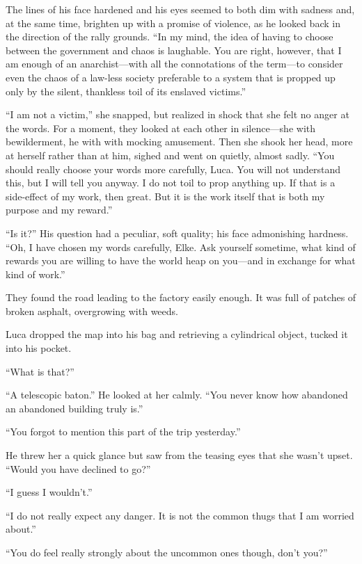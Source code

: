 The lines of his face hardened and his eyes seemed to both dim with sadness and, at the same time, brighten up with a promise of violence, as he looked back in the direction of the rally grounds. ``In my mind, the idea of having to choose between the government and chaos is laughable. You are right, however, that I am enough of an anarchist---with all the connotations of the term---to consider even the chaos of a law-less society preferable to a system that is propped up only by the silent, thankless toil of its enslaved victims.''

``I am not a victim,'' she snapped, but realized in shock that she felt no anger at the words. For a moment, they looked at each other in silence---she with bewilderment, he with with mocking amusement. Then she shook her head, more at herself rather than at him, sighed and went on quietly, almost sadly. ``You should really choose your words more carefully, Luca. You will not understand this, but I will tell you anyway. I do not toil to prop anything up. If that is a side-effect of my work, then great. But it is the work itself that is both my purpose and my reward.''

``Is it?'' His question had a peculiar, soft quality; his face admonishing hardness. ``Oh, I have chosen my words carefully, Elke. Ask yourself sometime, what kind of rewards you are willing to have the world heap on you---and in exchange for what kind of work.''

\sectionline

They found the road leading to the factory easily enough. It was full of patches of broken asphalt, overgrowing with weeds.

Luca dropped the map into his bag and retrieving a cylindrical object, tucked it into his pocket.

``What is that?''

``A telescopic baton.'' He looked at her calmly. ``You never know how abandoned an abandoned building truly is.''

``You forgot to mention this part of the trip yesterday.''

He threw her a quick glance but saw from the teasing eyes that she wasn't upset. ``Would you have declined to go?''

``I guess I wouldn't.''

``I do not really expect any danger. It is not the common thugs that I am worried about.''

``You do feel really strongly about the uncommon ones though, don't you?''

